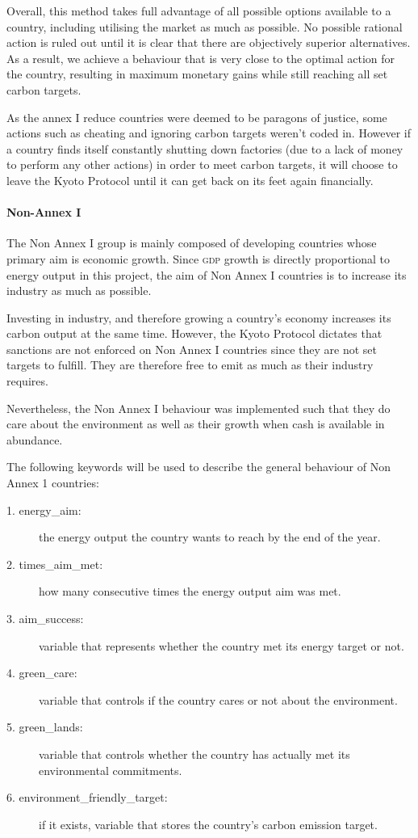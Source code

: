 Overall, this method takes full advantage of all possible options available to a country, including utilising the market as much as possible. No possible rational action is ruled out until it is clear that there are objectively superior alternatives. As a result, we achieve a behaviour that is very close to the optimal action for the country, resulting in maximum monetary gains while still reaching all set carbon targets.

As the annex I reduce countries were deemed to be paragons of justice, some actions such as cheating and ignoring carbon targets weren't coded in. However if a country finds itself constantly shutting down factories (due to a lack of money to perform any other actions) in order to meet carbon targets, it will choose to leave the Kyoto Protocol until it can get back on its feet again financially.

\paragraph{Non-Annex I}

The Non Annex I group is mainly composed of developing countries whose primary aim is economic growth. Since \textsc{gdp} growth is directly proportional to energy output in this project, the aim of Non Annex I countries is to increase its industry as much as possible. 

Investing in industry, and therefore growing a country's economy increases its carbon output at the same time. However, the Kyoto Protocol dictates that sanctions are not enforced on Non Annex I countries since they are not set targets to fulfill. They are therefore free to emit as much \CO as their industry requires.

Nevertheless, the Non Annex I behaviour was implemented such that they do care about the environment as well as their growth when cash is available in abundance.

The following keywords will be used to describe the general behaviour of Non Annex 1 countries:

\begin{description}
	\item[1. energy\_aim:] the energy output the country wants to reach by the end of the year.
	\item[2. times\_aim\_met:] how many consecutive times the energy output aim was met.
	\item[3. aim\_success:] variable that represents whether the country met its energy target or not.
	\item[4. green\_care:] variable that controls if the country cares or not about the environment.
	\item[5. green\_lands:] variable that controls whether the country has actually met its environmental commitments.
	\item[6. environment\_friendly\_target:] if it exists, variable that stores the country's carbon emission target. 
\end{description}

